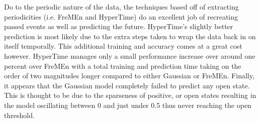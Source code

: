 Do to the periodic nature of the data, the techniques based off of extracting
periodicities (i.e. FreMEn and HyperTime) do an excellent job of recreating
passed events as well as predicting the future. HyperTime's slightly better
prediction is most likely due to the extra steps taken to wrap the data back
in on itself temporally.  This additional training and accuracy comes at a
great cost however. HyperTime manages only a small performance increase over
around one percent over FreMEn with a total training and prediction time
taking on the order of two magnitudes longer compared to either Gaussian or FreMEn.
Finally, it appears that the Gaussian model completely failed to predict any
open state.  This is thought to be due to the sparseness of positive, or open
states resulting in the model oscillating between 0 and just under 0.5 thus
never reaching the open threshold. \\

